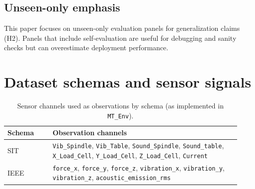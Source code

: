 \documentclass[sn-basic]{sn-jnl} %
\begin{document}
\begin{appendices}
\subsection{Unseen-only emphasis}
This paper focuses on unseen-only evaluation panels for generalization claims (H2). Panels that include self-evaluation are useful for debugging and sanity checks but can overestimate deployment performance.

\section{Dataset schemas and sensor signals}
\label{app:schema}
\begin{table}[t]
\centering
\caption{Sensor channels used as observations by schema (as implemented in \texttt{MT\_Env}).}
\label{tab:schema_features}
\begin{tabular}{p{0.18\linewidth} p{0.75\linewidth}}
\toprule
\textbf{Schema} & \textbf{Observation channels}\\
\midrule
SIT & \texttt{Vib\_Spindle}, \texttt{Vib\_Table}, \texttt{Sound\_Spindle}, \texttt{Sound\_table}, \texttt{X\_Load\_Cell}, \texttt{Y\_Load\_Cell}, \texttt{Z\_Load\_Cell}, \texttt{Current}\\
IEEE & \texttt{force\_x}, \texttt{force\_y}, \texttt{force\_z}, \texttt{vibration\_x}, \texttt{vibration\_y}, \texttt{vibration\_z}, \texttt{acoustic\_emission\_rms}\\
\bottomrule
\end{tabular}
\end{table}


\end{appendices}
\end{document}
